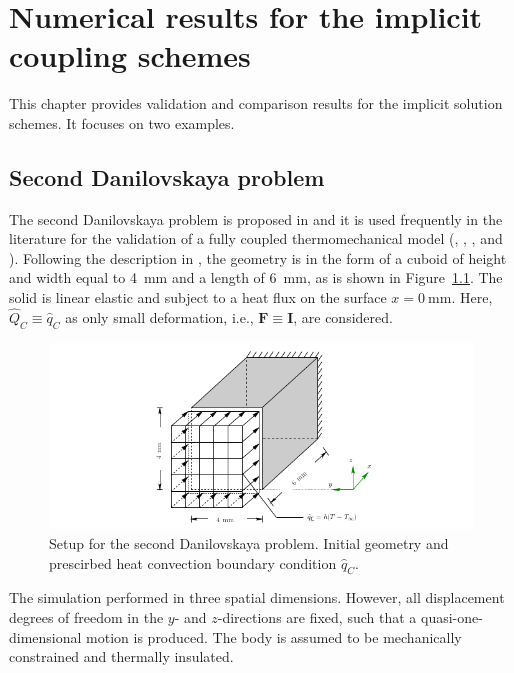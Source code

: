  \chapter{Numerical results for the implicit coupling schemes}

This chapter provides validation and comparison results for the implicit solution schemes.
It focuses on two examples.

\section{Second Danilovskaya problem}

The second Danilovskaya problem is proposed in \cite{danilovskaya_dynamical_1952} and it is used frequently in the literature for the validation of a fully coupled thermomechanical model (\cite{farhat_unconditionally_1991}, \cite{tosaka_boundary_1991}, \cite{tamma_effective_1992}, \cite{tanaka_application_1995} and \cite{danowski_computational_2014}).
Following the description in \cite{danowski_computational_2014}, the geometry is in the form of a cuboid of height and width equal to \SI{4}{\milli\meter} and a length of \SI{6}{\milli\meter}, as is shown in Figure~\ref{fig:setup_2nd_danilovskaya}.
The solid is linear elastic and subject to a heat flux on the surface \(x=\SI{0}{\milli\meter}\).
Here, \(\hat Q_C \equiv \hat q_C\)  as only small deformation, i.e., \(\mathbf F \equiv \mathbf I\), are considered.

\begin{figure}
  \includegraphics[width=\textwidth]{figures/setup_2nd_danilovskaya.png}
  \caption{Setup for the second Danilovskaya problem. Initial geometry and prescirbed heat convection boundary condition \(\hat q_C\).}
  \label{fig:setup_2nd_danilovskaya}
\end{figure}

The simulation performed in three spatial dimensions.
However, all displacement degrees of freedom in the \(y\)- and \(z\)-directions are fixed, such that a quasi-one-dimensional motion is produced.
The body is assumed to be mechanically constrained and thermally insulated.

